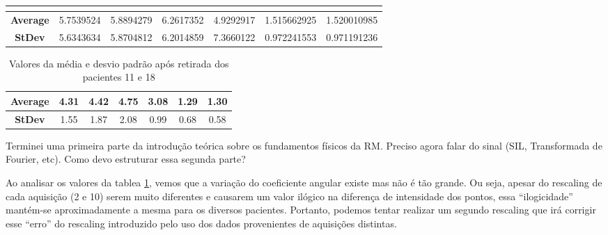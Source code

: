 \documentclass[idxtotoc,hyperref,openany]{labbook} %
\begin{document}
\begin{table}[]
\begin{tabular}{ccccccc}
		\textbf{}                               &                                        &                                        &                                        &                                   &                                         &                                         \\ \hline
		\multicolumn{1}{|c|}{\textbf{Average}}  & \multicolumn{1}{c|}{5.7539524}         & \multicolumn{1}{c|}{5.8894279}         & \multicolumn{1}{c|}{6.2617352}         & \multicolumn{1}{c|}{4.9292917}    & \multicolumn{1}{c|}{1.515662925}        & \multicolumn{1}{c|}{1.520010985}        \\ \hline
		\multicolumn{1}{|c|}{\textbf{StDev}}    & \multicolumn{1}{c|}{5.6343634}         & \multicolumn{1}{c|}{5.8704812}         & \multicolumn{1}{c|}{6.2014859}         & \multicolumn{1}{c|}{7.3660122}    & \multicolumn{1}{c|}{0.972241553}        & \multicolumn{1}{c|}{0.971191236}        \\ \hline
	\end{tabular}
\end{table}

\begin{table}[]
	\centering
	\caption{Valores da média e desvio padrão após retirada dos pacientes 11 e 18}
	\label{tabelaMedias2}
	\begin{tabular}{|c|c|c|c|c|c|c|}
		\hline
		\textbf{Average} & 4.31 & 4.42 & 4.75 & 3.08 & 1.29 & 1.30 \\ \hline
		\textbf{StDev}   & 1.55 & 1.87 & 2.08 & 0.99 & 0.68 & 0.58 \\ \hline
	\end{tabular}
\end{table}




Terminei uma primeira parte da introdução teórica sobre os fundamentos físicos da RM. Preciso agora falar do sinal (SIL, Transformada de Fourier, etc). Como devo estruturar essa segunda parte?


Ao analisar os valores da tablea \ref{tabelaMedias2}, vemos que a variação do coeficiente angular existe mas não é tão grande. Ou seja, apesar do rescaling de cada aquisição (2 e 10) serem muito diferentes e causarem um valor ilógico na diferença de intensidade dos pontos, essa ``ilogicidade'' mantém-se aproximadamente a mesma para os diversos pacientes. Portanto, podemos tentar realizar um segundo rescaling que irá corrigir esse ``erro'' do rescaling introduzido pelo uso dos dados provenientes de aquisições distintas.
\end{document}
